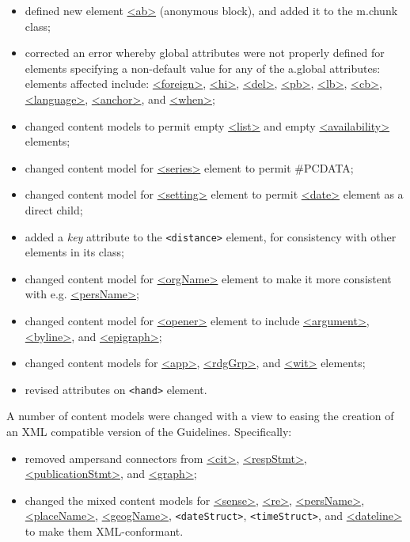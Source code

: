\begin{itemize}
\item defined new element \hyperref[TEI.ab]{<ab>} (anonymous block), and added it to the \textsf{m.chunk} class;
\item corrected an error whereby global attributes were not properly defined for elements specifying a non-default value for any of the \textsf{a.global} attributes: elements affected include: \hyperref[TEI.foreign]{<foreign>}, \hyperref[TEI.hi]{<hi>}, \hyperref[TEI.del]{<del>}, \hyperref[TEI.pb]{<pb>}, \hyperref[TEI.lb]{<lb>}, \hyperref[TEI.cb]{<cb>}, \hyperref[TEI.language]{<language>}, \hyperref[TEI.anchor]{<anchor>}, and \hyperref[TEI.when]{<when>};
\item changed content models to permit empty \hyperref[TEI.list]{<list>} and empty \hyperref[TEI.availability]{<availability>} elements;
\item changed content model for \hyperref[TEI.series]{<series>} element to permit \#PCDATA;
\item changed content model for \hyperref[TEI.setting]{<setting>} element to permit \hyperref[TEI.date]{<date>} element as a direct child;
\item added a {\itshape key} attribute to the \texttt{<distance>} element, for consistency with other elements in its class;
\item changed content model for \hyperref[TEI.orgName]{<orgName>} element to make it more consistent with e.g. \hyperref[TEI.persName]{<persName>};
\item changed content model for \hyperref[TEI.opener]{<opener>} element to include \hyperref[TEI.argument]{<argument>}, \hyperref[TEI.byline]{<byline>}, and \hyperref[TEI.epigraph]{<epigraph>};
\item changed content models for \hyperref[TEI.app]{<app>}, \hyperref[TEI.rdgGrp]{<rdgGrp>}, and \hyperref[TEI.wit]{<wit>} elements;
\item revised attributes on \texttt{<hand>} element.
\end{itemize} \par
A number of content models were changed with a view to easing the creation of an XML compatible version of the Guidelines. Specifically: \begin{itemize}
\item removed ampersand connectors from \hyperref[TEI.cit]{<cit>}, \hyperref[TEI.respStmt]{<respStmt>}, \hyperref[TEI.publicationStmt]{<publicationStmt>}, and \hyperref[TEI.graph]{<graph>};
\item changed the mixed content models for \hyperref[TEI.sense]{<sense>}, \hyperref[TEI.re]{<re>}, \hyperref[TEI.persName]{<persName>}, \hyperref[TEI.placeName]{<placeName>}, \hyperref[TEI.geogName]{<geogName>}, \texttt{<dateStruct>}, \texttt{<timeStruct>}, and \hyperref[TEI.dateline]{<dateline>} to make them XML-conformant.
\end{itemize} 

